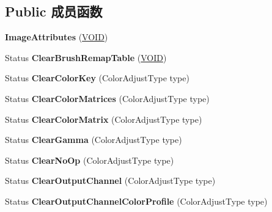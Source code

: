 \subsection*{Public 成员函数}
\begin{DoxyCompactItemize}
\item 
\mbox{\label{class_image_attributes_a59affc7b89989bfcc69e2941f2cfd55f}} 
{\bfseries Image\+Attributes} (\hyperlink{interfacevoid}{V\+O\+ID})
\item 
\mbox{\label{class_image_attributes_af97c5bea79f3dc166c354d2af44d91bc}} 
Status {\bfseries Clear\+Brush\+Remap\+Table} (\hyperlink{interfacevoid}{V\+O\+ID})
\item 
\mbox{\label{class_image_attributes_aaa79e06e4928ca3c707727d4a3ef1581}} 
Status {\bfseries Clear\+Color\+Key} (Color\+Adjust\+Type type)
\item 
\mbox{\label{class_image_attributes_a58c41338baf87af161fd7c248e57ce13}} 
Status {\bfseries Clear\+Color\+Matrices} (Color\+Adjust\+Type type)
\item 
\mbox{\label{class_image_attributes_a7fbc4aa6ba6f4703b89912bceafa48b8}} 
Status {\bfseries Clear\+Color\+Matrix} (Color\+Adjust\+Type type)
\item 
\mbox{\label{class_image_attributes_ac23cf2871f3ca045191f9f6a56c039d2}} 
Status {\bfseries Clear\+Gamma} (Color\+Adjust\+Type type)
\item 
\mbox{\label{class_image_attributes_aa3717ab62003e13d9d730b8c273e88e3}} 
Status {\bfseries Clear\+No\+Op} (Color\+Adjust\+Type type)
\item 
\mbox{\label{class_image_attributes_afa679cd60d171371b4e252d6acd4bfe0}} 
Status {\bfseries Clear\+Output\+Channel} (Color\+Adjust\+Type type)
\item 
\mbox{\label{class_image_attributes_ac73a51bdbecec60d9e9a86564f167e27}} 
Status {\bfseries Clear\+Output\+Channel\+Color\+Profile} (Color\+Adjust\+Type type)
\item 

\end{DoxyCompactItemize}
